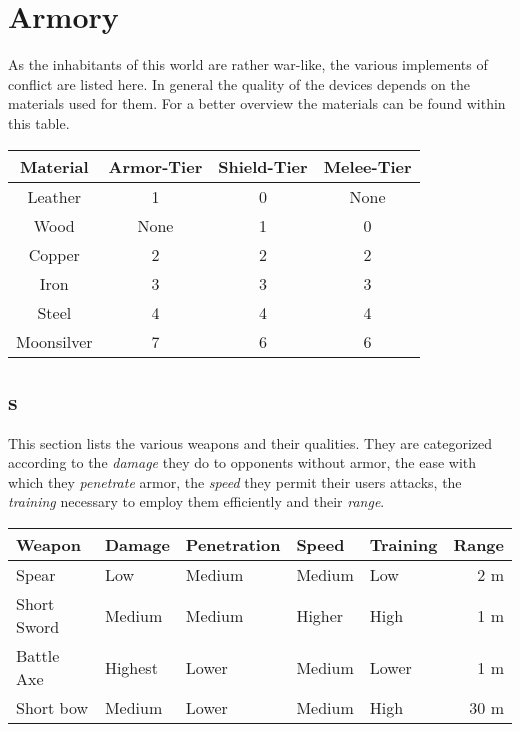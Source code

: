 \section{}\label{ch:Goods:Tools}

\section{Armory}\label{ch:Goods:Armory}

As the inhabitants of this world are rather war-like, the various implements of
conflict are listed here. In general the quality of the devices depends on the
materials used for them. For a better overview the materials can be found
within this table.

\begin{longtable}{cccc}
	\toprule
	Material   & Armor-Tier & Shield-Tier & Melee-Tier \\
	\midrule
	Leather    & 1          & 0           & None       \\
	Wood       & None       & 1           & 0          \\
	Copper     & 2          & 2           & 2          \\
	Iron       & 3          & 3           & 3          \\
	Steel      & 4          & 4           & 4          \\ %
	Moonsilver & 7          & 6           & 6          \\
	\bottomrule
\end{longtable}

\subsection{s}\label{ch:Goods:Armory:Weapons}

This section lists the various weapons and their qualities. They are
categorized according to the \emph{damage} they do to opponents without armor,
the ease with which they \emph{penetrate} armor, the \emph{speed} they permit
their users attacks, the \emph{training} necessary to employ them efficiently
and their \emph{range}.

\begin{longtable}{lllllr}
	\toprule
	Weapon
	 & Damage  & Penetration
	 & Speed   & Training    & Range \\
	\midrule
	Spear
	 & Low     & Medium
	 & Medium  & Low         & 2 m   \\
	Short Sword
	 & Medium  & Medium
	 & Higher  & High        & 1 m   \\
	Battle Axe
	 & Highest & Lower
	 & Medium  & Lower       & 1 m   \\
	Short bow
	 & Medium  & Lower
	 & Medium  & High        & 30 m  \\
	\bottomrule
\end{longtable}

